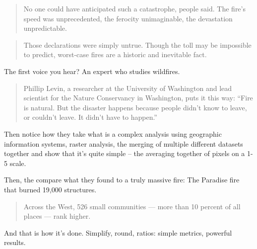 \documentclass[
  letterpaper,
  DIV=11,
  numbers=noendperiod]{scrreprt}
\begin{document}
\begin{quote}
No one could have anticipated such a catastrophe, people said. The
fire's speed was unprecedented, the ferocity unimaginable, the
devastation unpredictable.
\end{quote}

\begin{quote}
Those declarations were simply untrue. Though the toll may be impossible
to predict, worst-case fires are a historic and inevitable fact.
\end{quote}

The first voice you hear? An expert who studies wildfires.

\begin{quote}
Phillip Levin, a researcher at the University of Washington and lead
scientist for the Nature Conservancy in Washington, puts it this way:
``Fire is natural. But the disaster happens because people didn't know
to leave, or couldn't leave. It didn't have to happen.''
\end{quote}

Then notice how they take what is a complex analysis using geographic
information systems, raster analysis, the merging of multiple different
datasets together and show that it's quite simple -- the averaging
together of pixels on a 1-5 scale.

Then, the compare what they found to a truly massive fire: The Paradise
fire that burned 19,000 structures.

\begin{quote}
Across the West, 526 small communities --- more than 10 percent of all
places --- rank higher.
\end{quote}

And that is how it's done. Simplify, round, ratios: simple metrics,
powerful results.
\end{document}
